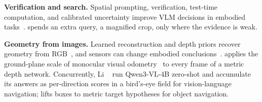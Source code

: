 \noindent\textbf{Verification and search.}
Spatial prompting, verification, test-time computation, and calibrated uncertainty improve VLM decisions in
embodied tasks~\cite{yang2023mark,nasiriany2024pivot,goetting2024navigation,kwok2025robomonkey,dao2026direct,choi2026scale,ren2023robots,liang2024introspective,ren2024explore}.
\ours spends an extra query, a magnified crop, only where the evidence is weak.

\noindent\textbf{Geometry from images.}
Learned reconstruction and depth priors recover geometry from RGB~\cite{wang2025vggt,murai2024mast,maggio2025vggt,wen2025foundationstereo,yang2024depthv2,lin2025depth},
and sensors can change embodied conclusions~\cite{corlito2026sensor,wang2025rethinking,cai2025navdp}. \ours applies the
ground-plane scale of monocular visual odometry~\cite{song2014robust} to every frame of a metric depth network.
Concurrently, Li \etal~\cite{li2026structure} run Qwen3-VL-4B zero-shot and accumulate its answers as per-direction
scores in a bird's-eye field for vision-language navigation; \ours lifts boxes to metric target hypotheses for
object navigation.
